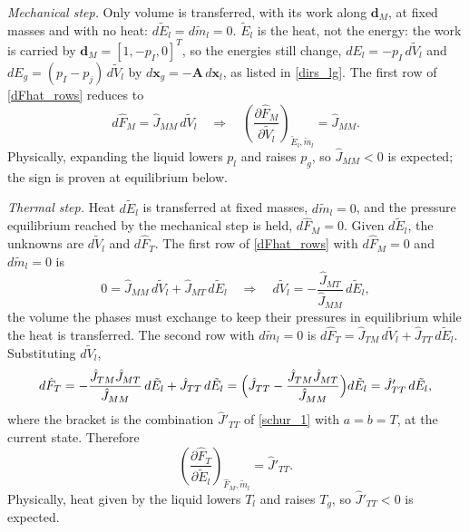 \emph{Mechanical step.} Only volume is transferred, with its work along $\boldsymbol{d}_M$, at fixed masses and with no heat: $d\tilde{E}_l=d\tilde{m}_l=0$. $\tilde{E}_l$ is the heat, not the energy: the work is carried by $\boldsymbol{d}_M=[1,-p_I,0]^T$, so the energies still change, $dE_l=-p_I\,d\tilde{V}_l$ and $dE_g=(p_I-p_{j})\,d\tilde{V}_l$ by $d\boldsymbol{x}_g=-\boldsymbol{A}\,d\boldsymbol{x}_l$, as listed in \eqref{dirs_lg}. The first row of \eqref{dFhat_rows} reduces to
\begin{equation}
d\hat{F}_M=\hat{J}_{MM}\,d\tilde{V}_l
\quad\Longrightarrow\quad
\left(\frac{\partial \hat{F}_M}{\partial\tilde{V}_l}\right)_{\tilde{E}_l,\tilde{m}_l}=\hat{J}_{MM}.
\end{equation}
Physically, expanding the liquid lowers $p_l$ and raises $p_g$, so $\hat{J}_{MM}<0$ is expected; the sign is proven at equilibrium below.

\emph{Thermal step.} Heat $d\tilde{E}_l$ is transferred at fixed masses, $d\tilde{m}_l=0$, and the pressure equilibrium reached by the mechanical step is held, $d\hat{F}_M=0$. Given $d\tilde{E}_l$, the unknowns are $d\tilde{V}_l$ and $d\hat{F}_T$. The first row of \eqref{dFhat_rows} with $d\hat{F}_M=0$ and $d\tilde{m}_l=0$ is
\begin{equation}
0=\hat{J}_{MM}\,d\tilde{V}_l+\hat{J}_{MT}\,d\tilde{E}_l
\quad\Longrightarrow\quad
d\tilde{V}_l=-\frac{\hat{J}_{MT}}{\hat{J}_{MM}}\,d\tilde{E}_l,
\end{equation}
the volume the phases must exchange to keep their pressures in equilibrium while the heat is transferred. The second row with $d\tilde{m}_l=0$ is $d\hat{F}_T=\hat{J}_{TM}\,d\tilde{V}_l+\hat{J}_{TT}\,d\tilde{E}_l$. Substituting $d\tilde{V}_l$,
\begin{equation}
d\hat{F}_T=-\frac{\hat{J}_{TM}\hat{J}_{MT}}{\hat{J}_{MM}}\,d\tilde{E}_l+\hat{J}_{TT}\,d\tilde{E}_l=\Bigl(\hat{J}_{TT}-\frac{\hat{J}_{TM}\hat{J}_{MT}}{\hat{J}_{MM}}\Bigr)d\tilde{E}_l=\hat{J}'_{TT}\,d\tilde{E}_l,
\end{equation}
where the bracket is the combination $\hat{J}'_{TT}$ of \eqref{schur_1} with $a=b=T$, at the current state. Therefore
\begin{equation}
\left(\frac{\partial \hat{F}_T}{\partial\tilde{E}_l}\right)_{\hat{F}_M,\tilde{m}_l}=\hat{J}'_{TT}.
\end{equation}
Physically, heat given by the liquid lowers $T_l$ and raises $T_g$, so $\hat{J}'_{TT}<0$ is expected.

